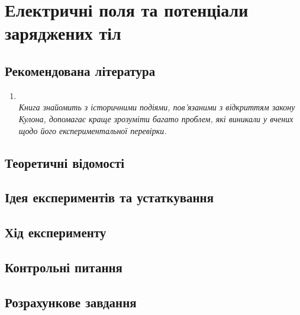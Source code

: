 
%
\expandafter\graphicspath\expandafter{\expandafter{\currfilebase/pic}}
\usetikzlibrary{arrows.meta}
\newcommand\Ground{%
\mathbin{\text{\begin{tikzpicture}[circuit ee IEC]
\draw (0,1ex) to (0,0) node[ground,rotate=-90,xshift=.3ex] {};
\end{tikzpicture}}}%
}

\chapter{Електричні поля та потенціали заряджених тіл}
\makeworktitle

\section*{Рекомендована література }
\begin{enumerate}
\item {}\\[0.5ex]
    \emph{Книга знайомить з історичними подіями, пов'язаними з відкриттям  закону Кулона, допомагає краще зрозуміти багато проблем, які виникали у вчених щодо його експериментальної перевірки.}\\[0.5ex]
\end{enumerate}



\section{Теоретичні відомості}




\section{Ідея експериментів та устаткування}




\section{Хід експерименту}



\section*{Контрольні питання}



\section*{Розрахункове завдання}




